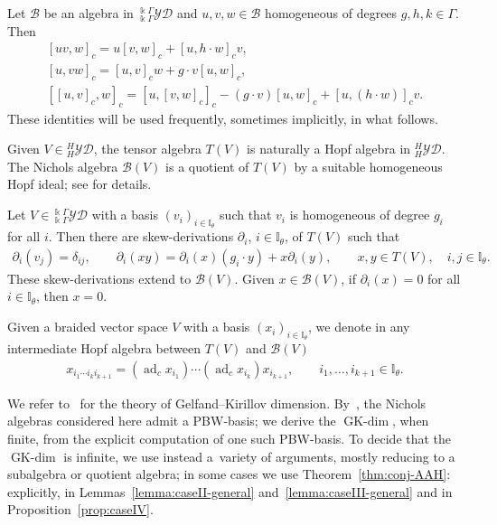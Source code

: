 \documentclass[pdftex]{sigma}
\numberwithin{equation}{section}
\newcommand{\adc}{\operatorname{ad}_c}
\newcommand{\GK}{\operatorname{GK-dim}}
\newcommand{\toba}{\mathscr B}
\newcommand{\I}{{\mathbb I}}
\newcommand{\yd}[1]{{}_{#1}^{#1}\mathcal{YD}}
\begin{document}
\begin{Remark}%
Let
$\toba$ be an algebra in $\yd{\Bbbk \Gamma}$ and $u,v,w\in\toba$ homogeneous of degrees $g,h,k\in\Gamma$. Then
\begin{gather}\label{eq:graded-bracket-derivation1}
[uv,w]_c = u[v,w]_c + [u,h\cdot w]_c v,
\\
\label{eq:graded-bracket-derivation2}
[u,vw]_c = [u,v]_c w + g\cdot v [u,w]_c,
\\
\label{eq:graded-bracket-jacobi}
[[u,v]_c,w]_c = [u,[v,w]_c]_c -(g\cdot v)[u,w]_c +[u,(h\cdot w)]_c v.
\end{gather}
These identities will be used frequently, sometimes implicitly, in what follows.
\end{Remark}

Given $V \in \yd{H}$, the tensor algebra $T(V)$ is naturally a Hopf algebra in $\yd{H}$.
The Nichols algebra $\toba(V)$ is a quotient of $T(V)$ by a suitable homogeneous Hopf ideal; see \cite{A-leyva} for details.

Let $V\in\yd{\Bbbk \Gamma}$ with a basis $(v_i)_{i\in \I_\theta}$ such that $v_i$ is homogeneous of degree $g_i$ for all $i$.
Then there are skew-derivations $\partial_i$, $i\in \I_{\theta}$, of $T(V)$ such that
\begin{align*}%
\partial _i(v_j) =\delta _{ij},\qquad
\partial _i(xy) = \partial _i(x)(g_i\cdot y)+x\partial _i(y),\qquad
x,y\in T(V), \quad i, j \in \I_{\theta}.
\end{align*}
These skew-derivations extend to $\toba(V)$. Given $x\in \toba(V)$, if
$\partial _i(x) = 0$ for all $i\in \I_\theta$, then $x=0$.

Given a braided vector space $V$ with a basis $(x_i)_{i\in\I_{\theta}}$, we denote in any intermediate Hopf algebra between $T(V)$ and $\toba(V)$
\begin{align*}%
x_{i_1\cdots i_k i_{k+1}}= (\adc x_{i_1}) \cdots (\adc x_{i_k})x_{i_{k+1}},\qquad i_1,\ldots,i_{k+1}\in\I_{\theta}.
\end{align*}

We refer to~\cite{KL} for the theory of Gelfand--Kirillov dimension.
By~\cite{Ufer}, the Nichols algebras considered here admit a PBW-basis; we derive the $\GK$, when finite, from
the explicit computation of one such PBW-basis. To decide that the $\GK$ is infinite, we use instead a~variety of arguments, mostly
reducing to a subalgebra or quotient algebra; in some cases we use Theorem~\ref{thm:conj-AAH}:
explicitly, in Lemmas~\ref{lemma:caseII-general} and~\ref{lemma:caseIII-general}
and in Proposition~\ref{prop:caseIV}.
\end{document}
